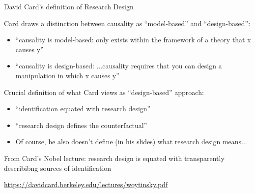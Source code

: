 \documentclass[notes,11pt, aspectratio=169]{beamer}
\newenvironment{wideitemize}{\itemize\addtolength{\itemsep}{10pt}}{\enditemize}
\begin{document}
\begin{frame}{David Card's definition of Research Design}
  \begin{wideitemize}
  \item Card draws a distinction between causality as ``model-based'' and ``design-based'':
    \begin{itemize}
    \item ``causality is model-based: only exists within the framework of a theory that x causes y''
    \item ``causality is design-based: ...causality requires that you can design a manipulation in which x causes y''
    \end{itemize}
  \item Crucial definition of what Card views as ``design-based'' approach:
    \begin{itemize}
    \item ``identification equated with research design''
    \item ``research design defines the counterfactual''
    \item Of course, he also doesn't define (in his slides) what research design means...
    \end{itemize}
  \item From Card's Nobel lecture: research design is equated with
    transparently describibng sources of identification
    \item   \url{https://davidcard.berkeley.edu/lectures/woytinsky.pdf}
  \end{wideitemize}
\end{frame}
\end{document}
